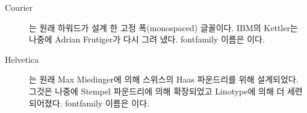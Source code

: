 \begin{description}
{\vspace{0.5\onelineskip}
\fox\par\Kafka\par\namesAZ
\vspace{0.5\onelineskip}
}


\item[Courier\facesubseeidx{Courier}] { 는 원래 하워드가 설계 한 고정 폭(monospaced) 글꼴이다.
IBM의 Kettler는 나중에 Adrian Frutiger가 다시 그려 냈다. fontfamily 이름은 이다.

\vspace{0.5\onelineskip}
\fox\par\Kafka\par\namesAZ
\vspace{0.5\onelineskip}
}


\item[Helvetica\facesubseeidx{Helvetica}] {는 원래 Max Miedinger에 의해 스위스의 Haas 파운드리를 위해 설계되었다. 
그것은 나중에 Stempel 파운드리에 의해 확장되었고 Linotype에 의해 더 세련되어졌다. fontfamily 이름은 이다.

\vspace{0.5\onelineskip}
\fox\par\Kafka\par\namesAZ
\vspace{0.5\onelineskip}
}



\end{description}
